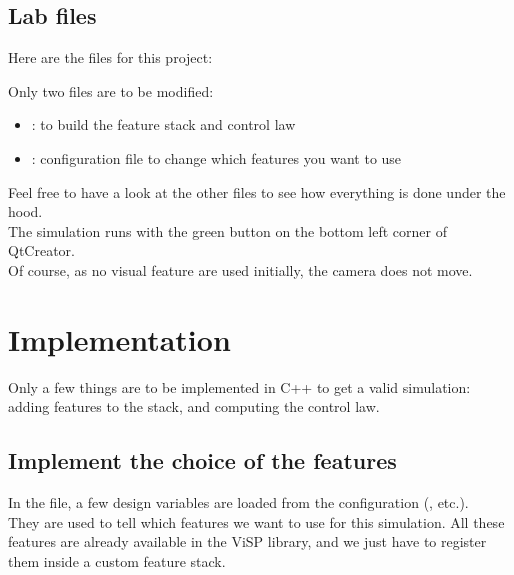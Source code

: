 \documentclass{ecnreport}
\begin{document}
\subsection{Lab files}

Here are the files for this project:

\begin{center}
\begin{minipage}{.4\linewidth}
\end{minipage}
\begin{minipage}{.55\linewidth}
 Only two files are to be modified:
 \begin{itemize}
  \item {}: to build the feature stack and control law
  \item {}: configuration file to change which features you want to use
 \end{itemize}
\end{minipage}
\end{center}

Feel free to have a look at the other files to see how everything is done under the hood.\\

The simulation runs with the green  button on the bottom left corner of QtCreator.\\
Of course, as no visual feature are used initially, the camera does not move.

\section{Implementation}

Only a few things are to be implemented in C++ to get a valid simulation: adding features to the stack, and computing the control law.

\subsection{Implement the choice of the features}

In the  file, a few design variables are loaded from the configuration (, etc.).\\

They are used to tell which features we want to use for this simulation. All these features are already available in the ViSP library, and we just have to register them inside a custom feature stack.\\
\end{document}
